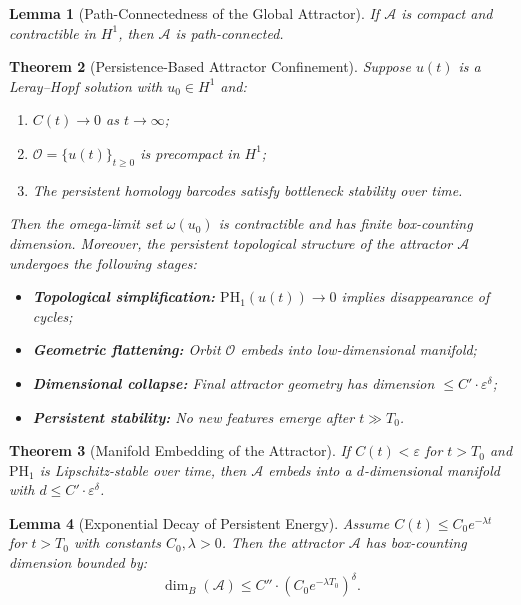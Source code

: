 \documentclass[11pt]{article}
\newtheorem{theorem}{Theorem}[section]
\newtheorem{lemma}[theorem]{Lemma}
\theoremstyle{definition}
\begin{document}
\begin{lemma}[Path-Connectedness of the Global Attractor]
If $\mathcal{A}$ is compact and contractible in $H^1$, then $\mathcal{A}$ is path-connected.
\end{lemma}

\begin{theorem}[Persistence-Based Attractor Confinement]
\label{thm:attractor-confinement}
Suppose $u(t)$ is a Leray--Hopf solution with $u_0 \in H^1$ and:
\begin{enumerate}
  \item $C(t) \to 0$ as $t \to \infty$;
  \item $\mathcal{O} = \{ u(t) \}_{t \ge 0}$ is precompact in $H^1$;
  \item The persistent homology barcodes satisfy bottleneck stability over time.
\end{enumerate}
Then the omega-limit set $\omega(u_0)$ is contractible and has finite box-counting dimension. Moreover, the persistent topological structure of the attractor $\mathcal{A}$ undergoes the following stages:
\begin{itemize}
  \item \textbf{Topological simplification:} $\mathrm{PH}_1(u(t)) \to 0$ implies disappearance of cycles;
  \item \textbf{Geometric flattening:} Orbit $\mathcal{O}$ embeds into low-dimensional manifold;
  \item \textbf{Dimensional collapse:} Final attractor geometry has dimension $\le C' \cdot \varepsilon^{\delta}$;
  \item \textbf{Persistent stability:} No new features emerge after $t \gg T_0$.
\end{itemize}
\end{theorem}

\begin{theorem}[Manifold Embedding of the Attractor]
If $C(t) < \varepsilon$ for $t > T_0$ and $\mathrm{PH}_1$ is Lipschitz-stable over time, then $\mathcal{A}$ embeds into a $d$-dimensional manifold with $d \le C' \cdot \varepsilon^\delta$.
\end{theorem}

\begin{lemma}[Exponential Decay of Persistent Energy]
\label{lem:exp-Ct}
Assume $C(t) \le C_0 e^{-\lambda t}$ for $t > T_0$ with constants $C_0, \lambda > 0$. Then the attractor $\mathcal{A}$ has box-counting dimension bounded by:
\[
\dim_B(\mathcal{A}) \le C'' \cdot (C_0 e^{-\lambda T_0})^\delta.
\]
\end{lemma}
\end{document}

